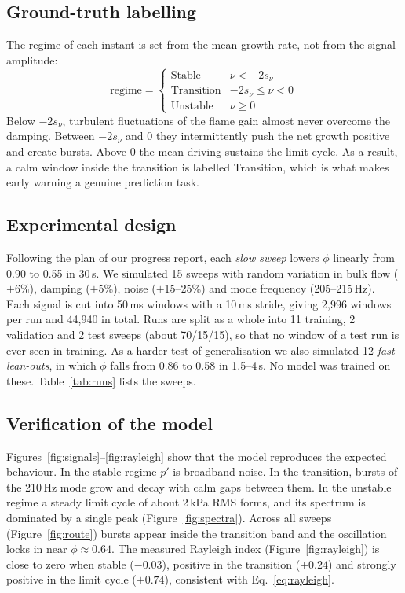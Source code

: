 \documentclass[11pt,a4paper]{article}
\newcommand{\pp}{p'}
\begin{document}
\subsection{Ground-truth labelling}
The regime of each instant is set from the mean growth rate, not from the signal amplitude:
\begin{equation}
  \text{regime} = \begin{cases} \text{Stable} & \nu < -2s_\nu \\ \text{Transition} & -2s_\nu \le \nu < 0 \\ \text{Unstable} & \nu \ge 0 \end{cases}
  \label{eq:labels}
\end{equation}
Below $-2s_\nu$, turbulent fluctuations of the flame gain almost never overcome the damping. Between $-2s_\nu$ and 0 they intermittently push the net growth positive and create bursts. Above 0 the mean driving sustains the limit cycle. As a result, a calm window inside the transition is labelled Transition, which is what makes early warning a genuine prediction task.

\subsection{Experimental design}
Following the plan of our progress report, each \emph{slow sweep} lowers $\phi$ linearly from 0.90 to 0.55 in 30\,s. We simulated 15 sweeps with random variation in bulk flow ($\pm$6\%), damping ($\pm$5\%), noise ($\pm$15--25\%) and mode frequency (205--215\,Hz). Each signal is cut into 50\,ms windows with a 10\,ms stride, giving 2{,}996 windows per run and 44{,}940 in total. Runs are split as a whole into 11 training, 2 validation and 2 test sweeps (about 70/15/15), so that no window of a test run is ever seen in training. As a harder test of generalisation we also simulated 12 \emph{fast lean-outs}, in which $\phi$ falls from 0.86 to 0.58 in 1.5--4\,s. No model was trained on these. Table~\ref{tab:runs} lists the sweeps.



\subsection{Verification of the model}
Figures~\ref{fig:signals}--\ref{fig:rayleigh} show that the model reproduces the expected behaviour. In the stable regime $\pp$ is broadband noise. In the transition, bursts of the 210\,Hz mode grow and decay with calm gaps between them. In the unstable regime a steady limit cycle of about 2\,kPa RMS forms, and its spectrum is dominated by a single peak (Figure~\ref{fig:spectra}). Across all sweeps (Figure~\ref{fig:route}) bursts appear inside the transition band and the oscillation locks in near $\phi\approx0.64$. The measured Rayleigh index (Figure~\ref{fig:rayleigh}) is close to zero when stable ($-0.03$), positive in the transition ($+0.24$) and strongly positive in the limit cycle ($+0.74$), consistent with Eq.~\eqref{eq:rayleigh}.
\end{document}
